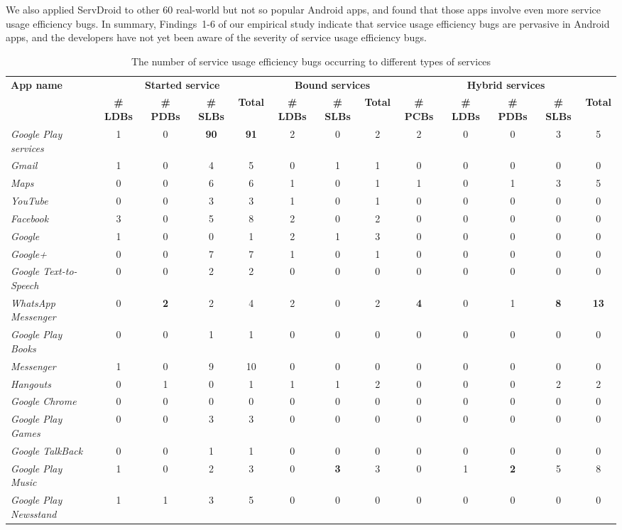 \documentclass[sigconf,review, anonymous]{acmart}
\begin{document}
We also applied \textsf{ServDroid} to other 60 real-world but not so popular Android apps, and found that those apps involve even more service usage efficiency bugs. In summary, Findings~1-6 of our empirical study indicate that service usage efficiency bugs are pervasive in Android apps, and the developers have not yet been aware of the severity of service usage efficiency bugs.

\begin{table} [htbp]
\centering
\small
\caption{The number of service usage efficiency bugs occurring to different types of services}
\begin{tabular}{|l|cccc|ccc|ccccc|}\hline
{\bf App name}&\multicolumn{4}{|c|}{\textbf{Started service}}&\multicolumn{3}{|c|}{\textbf{Bound services}}&\multicolumn{5}{|c|}{\textbf{Hybrid services}}\\
& {\bf \# LDBs}&{\bf \# PDBs} &{\bf \# SLBs}&{\bf Total}
& {\bf \# LDBs}& {\bf \# SLBs}&{\bf Total}
& {\bf \# PCBs}&{\bf \# LDBs}&{\bf \# PDBs} &{\bf \# SLBs}&{\bf Total}\\
\hline
\hline
{\it Google Play services}&1&0&{\bf 90}&{\bf 91}&2&0&2&2&0&0&3&5\\
{\it Gmail}&1&0&4&5&0&1&1&0&0&0&0&0\\
{\it Maps}&0&0&6&6&1&0&1&1&0&1&3&5\\
{\it YouTube}&0&0&3&3&1&0&1&0&0&0&0&0\\
{\it Facebook}&3&0&5&8&2&0&2&0&0&0&0&0\\
{\it Google}&1&0&0&1&2&1&3&0&0&0&0&0\\
{\it Google+}&0&0&7&7&1&0&1&0&0&0&0&0\\
{\it Google Text-to-Speech}&0&0&2&2&0&0&0&0&0&0&0&0\\
{\it WhatsApp Messenger}&0&{\bf 2}&2&4&2&0&2&{\bf 4}&0&1&{\bf 8}&{\bf 13}\\
{\it Google Play Books}&0&0&1&1&0&0&0&0&0&0&0&0\\
{\it Messenger}&1&0&9&10&0&0&0&0&0&0&0&0\\
{\it Hangouts}&0&1&0&1&1&1&2&0&0&0&2&2\\
{\it Google Chrome}&0&0&0&0&0&0&0&0&0&0&0&0\\
{\it Google Play Games}&0&0&3&3&0&0&0&0&0&0&0&0\\
{\it Google TalkBack}&0&0&1&1&0&0&0&0&0&0&0&0\\
{\it Google Play Music}&1&0&2&3&0&{\bf 3}&3&0&1&{\bf 2}&5&8\\
{\it Google Play Newsstand}&1&1&3&5&0&0&0&0&0&0&0&0\\

\end{tabular}
\end{table}
\end{document}
